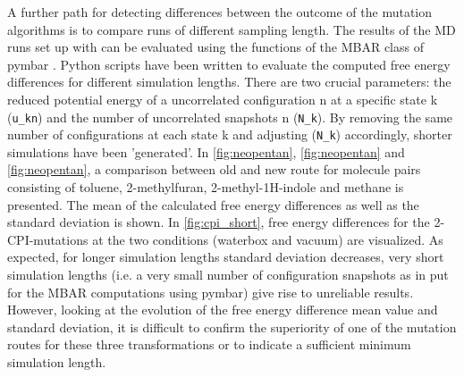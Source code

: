 A further path for detecting differences between the outcome of the mutation algorithms is to compare runs of different sampling length. 
The results of the MD runs set up with {\trafo} can be evaluated using the functions of the MBAR class of pymbar \cite{Shirts.2008}. Python scripts have been written to evaluate the computed free energy differences for different simulation lengths. There are two crucial parameters: the reduced potential energy of a uncorrelated configuration n at a specific state k (\texttt{u\_kn}) and the number of uncorrelated snapshots n (\texttt{N\_k}). By removing the same number of configurations at each state k and adjusting (\texttt{N\_k}) accordingly, shorter simulations have been 'generated'.
In \ref{fig:neopentan}, \ref{fig:neopentan} and \ref{fig:neopentan}, a comparison between old and new route for molecule pairs consisting of toluene, 2-methylfuran, 2-methyl-1H-indole and methane is presented. The mean of the calculated free energy differences as well as the standard deviation is shown. In \ref{fig:cpi_short}, free energy differences for the 2-CPI-mutations at the two conditions (waterbox and vacuum) are visualized. 
As expected, for longer simulation lengths standard deviation decreases, very short simulation lengths (i.e. a very small number of configuration snapshots as in put for the MBAR computations using pymbar) give rise to unreliable results. However, looking at the evolution of the free energy difference mean value and standard deviation, it is difficult to confirm the superiority of one of the mutation routes for these three transformations or to indicate a sufficient minimum simulation length.



